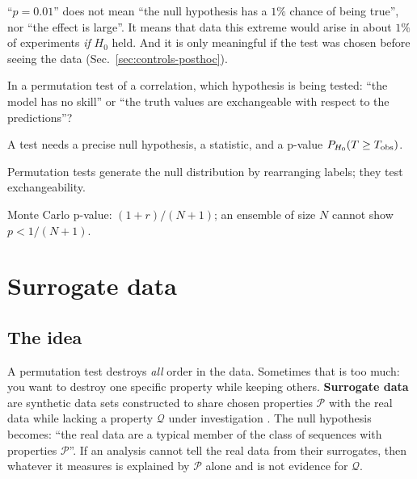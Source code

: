 \begin{pitfall}
``$p=0.01$'' does not mean ``the null hypothesis has a $1\%$ chance of being true'', nor ``the effect is large''. It means that data this extreme would arise in about $1\%$ of experiments \emph{if} $H_0$ held. And it is only meaningful if the test was chosen before seeing the data (Sec.~\ref{sec:controls-posthoc}).
\end{pitfall}

\begin{checkpoint}
In a permutation test of a correlation, which hypothesis is being tested: ``the model has no skill'' or ``the truth values are exchangeable with respect to the predictions''?
\end{checkpoint}

\begin{keyideas}
\item A test needs a precise null hypothesis, a statistic, and a p-value $P_{H_0}(T\ge T_{\rm obs})$.
\item Permutation tests generate the null distribution by rearranging labels; they test exchangeability.
\item Monte Carlo p-value: $(1+r)/(N+1)$; an ensemble of size $N$ cannot show $p<1/(N+1)$.
\end{keyideas}

\section{Surrogate data}\label{sec:controls-surrogates}

\subsection{The idea}

A permutation test destroys \emph{all} order in the data. Sometimes that is too much: you want to destroy one specific property while keeping others. \textbf{Surrogate data} are synthetic data sets constructed to share chosen properties $\mathcal P$ with the real data while lacking a property $\mathcal Q$ under investigation \cite{theiler}. The null hypothesis becomes: ``the real data are a typical member of the class of sequences with properties $\mathcal P$''. If an analysis cannot tell the real data from their surrogates, then whatever it measures is explained by $\mathcal P$ alone and is not evidence for $\mathcal Q$.

